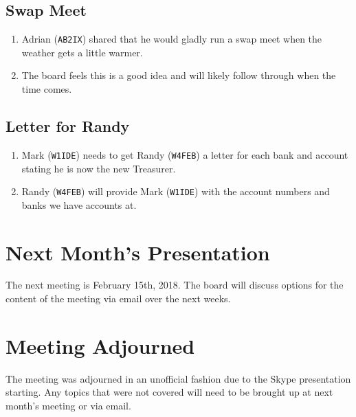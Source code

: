 \documentclass[10pt,letterpaper]{article}
\begin{document}
\subsection{Swap Meet}
\begin{enumerate}
  \item Adrian (\texttt{AB2IX}) shared that he would gladly run a swap meet when the weather gets a little warmer.
  \item The board feels this is a good idea and will likely follow through when the time comes.
\end{enumerate}

\subsection{Letter for Randy}
\begin{enumerate}
  \item Mark (\texttt{W1IDE}) needs to get Randy (\texttt{W4FEB}) a letter for each bank and account stating he is now the new Treasurer.
  \item Randy (\texttt{W4FEB}) will provide Mark (\texttt{W1IDE}) with the account numbers and banks we have accounts at.
\end{enumerate}

\section{Next Month's Presentation}
The next meeting is February 15th, 2018. The board will discuss options for the content of the meeting via email over the next weeks.

\section{Meeting Adjourned}
The meeting was adjourned in an unofficial fashion due to the Skype presentation starting. Any topics that were not covered will need to be brought up at next month's meeting or via email.
\end{document}
